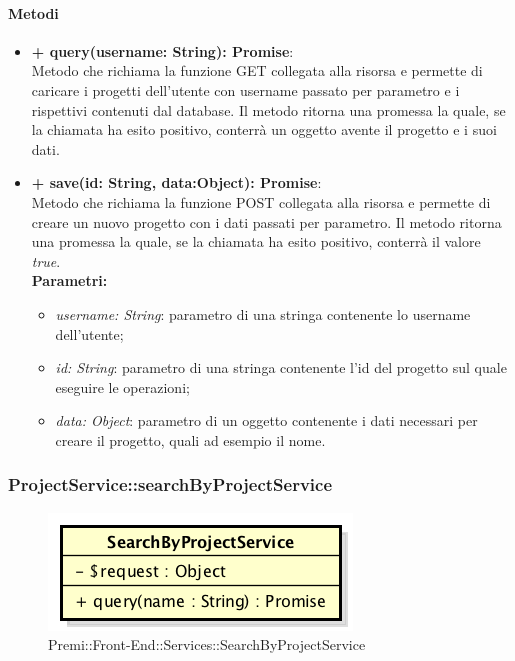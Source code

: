 		\paragraph{Metodi}
		\begin{itemize}
			\item \textbf{+ query(username: String): Promise}:\\
			Metodo che richiama la funzione GET collegata alla risorsa e permette di caricare i progetti dell'utente con username passato per parametro e i rispettivi contenuti dal \gls{database}. Il metodo ritorna una promessa la quale, se la chiamata ha esito positivo, conterrà un oggetto avente il progetto e i suoi dati.\\
			\item \textbf{+ save(id: String, data:Object): Promise}:\\
			Metodo che richiama la funzione POST collegata alla risorsa e permette di creare un nuovo progetto con i dati passati per parametro. Il metodo ritorna una promessa la quale, se la chiamata ha esito positivo, conterrà il valore \textit{true}.\\
			\textbf{Parametri:}\\
			\begin{itemize}
				\item \textit{username: String}: parametro di una stringa contenente lo username dell'utente;
				\item \textit{id: String}: parametro di una stringa contenente l'id del progetto sul quale eseguire le operazioni;
				\item \textit{data: Object}: parametro di un oggetto contenente i dati necessari per creare il progetto, quali ad esempio il nome.
			\end{itemize}
		\end{itemize}
\newpage
		
		
		\subsubsection{ProjectService::searchByProjectService}
		\begin{figure}[h]
			\centering
				\includegraphics[width=0.4\linewidth]{img/premi_front_end_services_searchbyprojectservice}
			\caption[Premi::Front-End::Services::SearchByProjectService]{Premi::Front-End::Services::SearchByProjectService}
		\end{figure}
		
